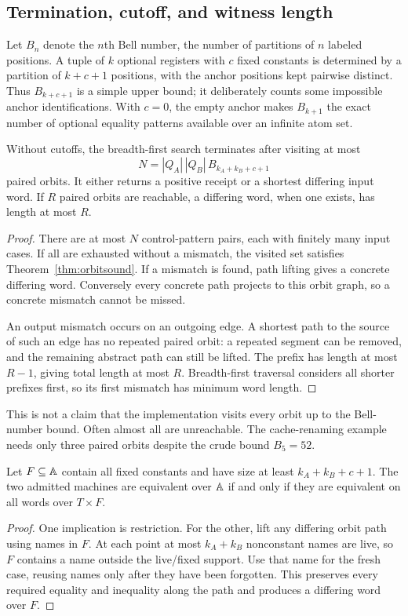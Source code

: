 \subsection{Termination, cutoff, and witness length}
Let $B_n$ denote the $n$th Bell number, the number of partitions of $n$ labeled
positions. A tuple of $k$ optional registers with $c$ fixed constants is
determined by a partition of $k+c+1$ positions, with the anchor positions kept
pairwise distinct. Thus $B_{k+c+1}$ is a simple upper bound; it deliberately
counts some impossible anchor identifications. With $c=0$, the empty anchor
makes $B_{k+1}$ the exact number of optional equality patterns available over an
infinite atom set.

\begin{theorem}
\label{thm:orbitcomplete}
Without cutoffs, the breadth-first search terminates after visiting at most
\[
 N=|Q_A|\,|Q_B|\,B_{k_A+k_B+c+1}
\]
paired orbits. It either returns a positive receipt or a shortest differing
input word. If $R$ paired orbits are reachable, a differing word, when one
exists, has length at most $R$.
\end{theorem}
\begin{proof}
There are at most $N$ control-pattern pairs, each with finitely many input
cases. If all are exhausted without a mismatch, the visited set satisfies
Theorem~\ref{thm:orbitsound}. If a mismatch is found, path lifting gives a
concrete differing word. Conversely every concrete path projects to this orbit
graph, so a concrete mismatch cannot be missed.

An output mismatch occurs on an outgoing edge. A shortest path to the source
of such an edge has no repeated paired orbit: a repeated segment can be removed,
and the remaining abstract path can still be lifted. The prefix has length at
most $R-1$, giving total length at most $R$. Breadth-first traversal considers
all shorter prefixes first, so its first mismatch has minimum word length.
\end{proof}

This is not a claim that the implementation visits every orbit up to the
Bell-number bound. Often almost all are unreachable. The cache-renaming
example needs only three paired orbits despite the crude bound $B_5=52$.

\begin{corollary}
\label{cor:cutoff}
Let $F\subseteq\mathbb A$ contain all fixed constants and have size at least
$k_A+k_B+c+1$. The two admitted machines are equivalent over $\mathbb A$ if and
only if they are equivalent on all words over $T\times F$.
\end{corollary}
\begin{proof}
One implication is restriction. For the other, lift any differing orbit path
using names in $F$. At each point at most $k_A+k_B$ nonconstant names are live,
so $F$ contains a name outside the live/fixed support. Use that name for the
fresh case, reusing names only after they have been forgotten. This preserves
every required equality and inequality along the path and produces a differing
word over $F$.
\end{proof}

